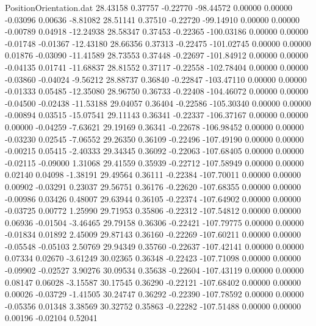 \begin{filecontents}{PositionOrientation.dat}
  28.43158    0.37757   -0.22770   -98.44572    0.00000    0.00000   -0.03096    0.00636   -8.81082
  28.51141    0.37510   -0.22720   -99.14910    0.00000    0.00000   -0.00789    0.04918  -12.24938
  28.58347    0.37453   -0.22365  -100.03186    0.00000    0.00000   -0.01748   -0.01367  -12.43180
  28.66356    0.37313   -0.22475  -101.02745    0.00000    0.00000    0.01876   -0.03090  -11.41589
  28.73553    0.37448   -0.22697  -101.84912    0.00000    0.00000   -0.04135    0.01741  -11.68837
  28.81552    0.37117   -0.22558  -102.78404    0.00000    0.00000   -0.03860   -0.04024   -9.56212
  28.88737    0.36840   -0.22847  -103.47110    0.00000    0.00000   -0.01333    0.05485  -12.35080
  28.96750    0.36733   -0.22408  -104.46072    0.00000    0.00000   -0.04500   -0.02438  -11.53188
  29.04057    0.36404   -0.22586  -105.30340    0.00000    0.00000   -0.00894    0.03515  -15.07541
  29.11143    0.36341   -0.22337  -106.37167    0.00000    0.00000    0.00000   -0.04259   -7.63621
  29.19169    0.36341   -0.22678  -106.98452    0.00000    0.00000   -0.03230    0.02545   -7.06552
  29.26350    0.36109   -0.22496  -107.49190    0.00000    0.00000   -0.00215    0.05415   -2.40333
  29.34345    0.36092   -0.22063  -107.68405    0.00000    0.00000   -0.02115   -0.09000    1.31068
  29.41559    0.35939   -0.22712  -107.58949    0.00000    0.00000    0.02140    0.04098   -1.38191
  29.49564    0.36111   -0.22384  -107.70011    0.00000    0.00000    0.00902   -0.03291    0.23037
  29.56751    0.36176   -0.22620  -107.68355    0.00000    0.00000   -0.00986    0.03426    0.48007
  29.63944    0.36105   -0.22374  -107.64902    0.00000    0.00000   -0.03725    0.00772    1.25990
  29.71953    0.35806   -0.22312  -107.54812    0.00000    0.00000    0.06936   -0.01504   -3.46465
  29.79158    0.36306   -0.22421  -107.79775    0.00000    0.00000   -0.01834    0.01892    2.45009
  29.87143    0.36160   -0.22269  -107.60211    0.00000    0.00000   -0.05548   -0.05103    2.50769
  29.94349    0.35760   -0.22637  -107.42141    0.00000    0.00000    0.07334    0.02670   -3.61249
  30.02365    0.36348   -0.22423  -107.71098    0.00000    0.00000   -0.09902   -0.02527    3.90276
  30.09534    0.35638   -0.22604  -107.43119    0.00000    0.00000    0.08147    0.06028   -3.15587
  30.17545    0.36290   -0.22121  -107.68402    0.00000    0.00000    0.00026   -0.03729   -1.41505
  30.24747    0.36292   -0.22390  -107.78592    0.00000    0.00000   -0.05356    0.01348    3.38569
  30.32752    0.35863   -0.22282  -107.51488    0.00000    0.00000    0.00196   -0.02104    0.52041

\end{filecontents}
